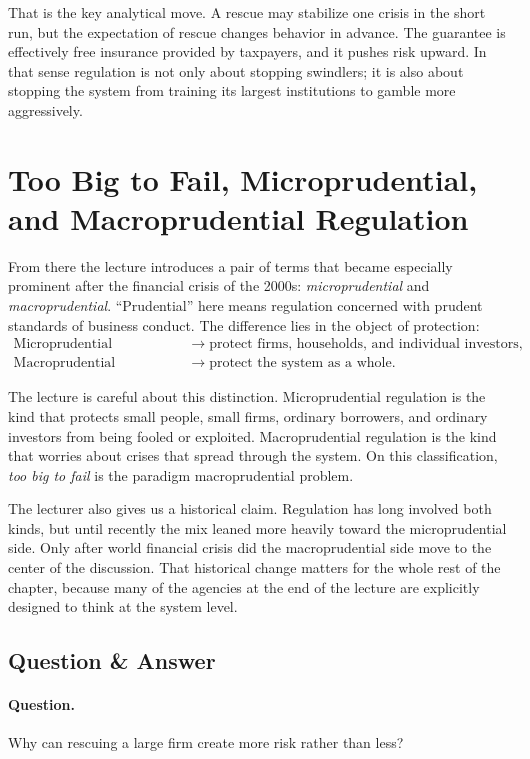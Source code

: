That is the key analytical move. A rescue may stabilize one crisis in the short run, but the expectation of rescue changes behavior in advance. The guarantee is effectively free insurance provided by taxpayers, and it pushes risk upward. In that sense regulation is not only about stopping swindlers; it is also about stopping the system from training its largest institutions to gamble more aggressively.

\section{Too Big to Fail, Microprudential, and Macroprudential Regulation}

From there the lecture introduces a pair of terms that became especially prominent after the financial crisis of the 2000s: \emph{microprudential} and \emph{macroprudential}. ``Prudential'' here means regulation concerned with prudent standards of business conduct. The difference lies in the object of protection:
\begin{align}
\text{Microprudential regulation}
&\longrightarrow
\text{protect firms, households, and individual investors},\\
\text{Macroprudential regulation}
&\longrightarrow
\text{protect the system as a whole}.
\end{align}

The lecture is careful about this distinction. Microprudential regulation is the kind that protects small people, small firms, ordinary borrowers, and ordinary investors from being fooled or exploited. Macroprudential regulation is the kind that worries about crises that spread through the system. On this classification, \emph{too big to fail} is the paradigm macroprudential problem.

The lecturer also gives us a historical claim. Regulation has long involved both kinds, but until recently the mix leaned more heavily toward the microprudential side. Only after world financial crisis did the macroprudential side move to the center of the discussion. That historical change matters for the whole rest of the chapter, because many of the agencies at the end of the lecture are explicitly designed to think at the system level.

\subsection{Question \& Answer}

\paragraph{Question.} Why can rescuing a large firm create more risk rather than less?

